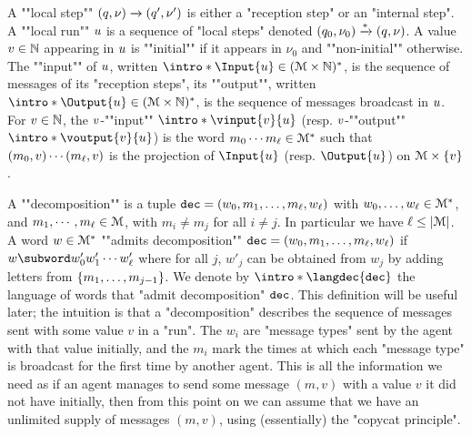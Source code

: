 	\AP A ""local step"" $(q,\nu) \xrightarrow{} (q',\nu')$ is either a "reception step" or an "internal step". 
	\AP A ""local run"" $u$ is a sequence of "local steps" denoted $(q_0, \nu_0) \xrightarrow{*} (q, \nu)$.
	A value $v \in \mathbb{N}$ appearing in $u$ is ""initial"" if it appears in $\nu_0$ and ""non-initial"" otherwise. 
	The ""input"" of $u$, written $\intro*\Input{\localrun} \in (\messages \times \nats)^*$, is the sequence of messages of its "reception steps", its ""output"", written $\intro*\Output{\localrun} \in (\messages \times \nats)^*$, is the sequence of messages broadcast in $u$. 
	For $v \in \mathbb{N}$, the $v$-""input"" $\intro*\vinput{\aval}{\localrun}$ (resp. $v$-""output"" $\intro*\voutput{\aval}{\localrun}$) is the word $m_0 \cdots m_{\ell} \in \mathcal{M}^*$ such that $(m_0, v) \cdots (m_{\ell}, v)$ is the projection of $\Input{\localrun}$ (resp. $\Output{\localrun}$) on $\mathcal{M} \times \{v\}$. 
 
	A ""decomposition"" is a tuple $\mathtt{dec} = (w_0, m_1, \ldots, m_\ell, w_\ell)$ with $w_0, \ldots, w_\ell \in \mathcal{M}^*$, and $m_1, \cdots, m_\ell \in \mathcal{M}$, with $m_i \neq m_j$ for all $i\neq j$. In particular we have $\ell \leq |\mathcal{M}|$. 
	A word $w \in \mathcal{M}^*$ ""admits decomposition"" $\mathtt{dec} = (w_0, m_1, \ldots, m_\ell, w_\ell)$ if $w \subword w'_0 w'_1 \cdots w'_\ell$ where for all $j$, $w'_j$ can be obtained from $w_j$ by adding letters from $\{m_1, \ldots, m_{j-1}\}$. 
	We denote by $\intro*\langdec{\decsymb}$ the language of words that "admit decomposition" $\mathtt{dec}$. 
	This definition will be useful later; the intuition is that a "decomposition" describes the sequence of messages sent with some value $v$ in a "run". The $w_i$ are "message types" sent by the agent with that value initially, and the $m_i$ mark the times at which each "message type" is broadcast for the first time by another agent. This is all the information we need as if an agent manages to send some message $(m,v)$ with a value $v$ it did not have initially, then from this point on we can assume that we have an unlimited supply of messages $(m,v)$, using (essentially) the "copycat principle".  


